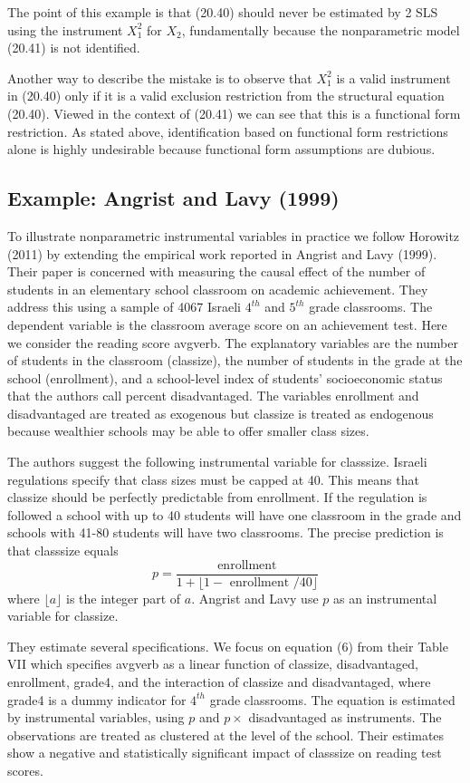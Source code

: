 \documentclass[10pt]{article}
\begin{document}
The point of this example is that (20.40) should never be estimated by 2 SLS using the instrument $X_{1}^{2}$ for $X_{2}$, fundamentally because the nonparametric model (20.41) is not identified.

Another way to describe the mistake is to observe that $X_{1}^{2}$ is a valid instrument in (20.40) only if it is a valid exclusion restriction from the structural equation (20.40). Viewed in the context of (20.41) we can see that this is a functional form restriction. As stated above, identification based on functional form restrictions alone is highly undesirable because functional form assumptions are dubious.

\subsection{Example: Angrist and Lavy (1999)}
To illustrate nonparametric instrumental variables in practice we follow Horowitz (2011) by extending the empirical work reported in Angrist and Lavy (1999). Their paper is concerned with measuring the causal effect of the number of students in an elementary school classroom on academic achievement. They address this using a sample of 4067 Israeli $4^{t h}$ and $5^{t h}$ grade classrooms. The dependent variable is the classroom average score on an achievement test. Here we consider the reading score avgverb. The explanatory variables are the number of students in the classroom (classize), the number of students in the grade at the school (enrollment), and a school-level index of students' socioeconomic status that the authors call percent disadvantaged. The variables enrollment and disadvantaged are treated as exogenous but classize is treated as endogenous because wealthier schools may be able to offer smaller class sizes.

The authors suggest the following instrumental variable for classsize. Israeli regulations specify that class sizes must be capped at 40. This means that classize should be perfectly predictable from enrollment. If the regulation is followed a school with up to 40 students will have one classroom in the grade and schools with 41-80 students will have two classrooms. The precise prediction is that classsize equals
$$
p=\frac{\text { enrollment }}{1+\lfloor 1-\text { enrollment } / 40\rfloor}
$$
where $\lfloor a\rfloor$ is the integer part of $a$. Angrist and Lavy use $p$ as an instrumental variable for classize.

They estimate several specifications. We focus on equation (6) from their Table VII which specifies avgverb as a linear function of classize, disadvantaged, enrollment, grade4, and the interaction of classize and disadvantaged, where grade4 is a dummy indicator for $4^{t h}$ grade classrooms. The equation is estimated by instrumental variables, using $p$ and $p \times$ disadvantaged as instruments. The observations are treated as clustered at the level of the school. Their estimates show a negative and statistically significant impact of classsize on reading test scores.
\end{document}
